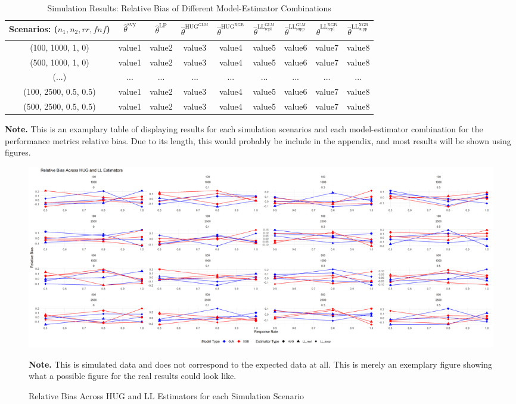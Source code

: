 \documentclass[12pt, a4paper]{article}
\begin{document}
\begin{table}[ht]
    \centering
    \caption{Simulation Results: Relative Bias of Different Model-Estimator Combinations}
    \begin{tabular}{c|c|c|c|c|c|c|c|c}
         \hline
         \text{Scenarios: \\ ($n_1, n_2, rr, fnf$)} & $\hat\theta^{\text{svy}}$ & $\hat\theta^{\text{LP}}$ & $\hat\theta^{\text{HUG}^{\text{GLM}}}$ & $\hat\theta^{\text{HUG}^{\text{XGB}}}$ & $\hat\theta^{\text{LL}^{\text{GLM}}_{\text{repl}}}$ & $\hat\theta^{\text{LL}^{\text{GLM}}_{\text{supp}}}$ & $\hat\theta^{\text{LL}^{\text{XGB}}_{\text{repl}}}$ & $\hat\theta^{\text{LL}^{\text{XGB}}_{\text{supp}}}$ \\ \hline
         (100, 1000, 1, 0) & value1 & value2 & value3  & value4 & value5 & value6 & value7 & value8 \\ \hline
         (500, 1000, 1, 0) & value1 & value2 & value3  & value4 & value5 & value6 & value7 & value8 \\ \hline
         (...) & ... & ... & ...  & ... & ... & ... & ... & ... \\ \hline
         (100, 2500, 0.5, 0.5) & value1 & value2 & value3  & value4 & value5 & value6 & value7 & value8 \\ \hline
         (500, 2500, 0.5, 0.5) & value1 & value2 & value3  & value4 & value5 & value6 & value7 & value8 \\ \hline
    \end{tabular}
    \raggedright
    \textbf{Note.}  This is an examplary table of displaying results for each simulation scenarios and each model-estimator combination for the performance metrics relative bias. Due to its length, this would probably be include in the appendix, and most results will be shown using figures.
    \label{tab:my_label}
\end{table}

\begin{landscape} 
\begin{figure}[htbp]
    \caption{Relative Bias Across HUG and LL Estimators for each Simulation Scenario}
    \centering
    \includegraphics[width=1.8\textwidth]{Rplot02.png}  %
    \label{fig:Rplot02}
    \raggedright
    \textbf{Note.} This is simulated data and does not correspond to the expected data at all. This is merely an exemplary figure showing what a possible figure for the real results could look like.
\end{figure}
\end{landscape}


\newpage
\printbibliography
\end{document}
